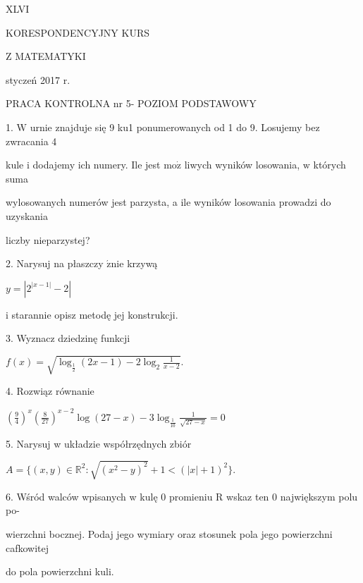\documentclass[a4paper,12pt]{article}
\begin{document}
XLVI

KORESPONDENCYJNY KURS

Z MATEMATYKI

styczeń 2017 r.

PRACA KONTROLNA nr 5- POZIOM PODSTAWOWY

1. $\mathrm{W}$ urnie znajduje się 9 ku1 ponumerowanych od 1 do 9. Losujemy bez zwracania 4

kule $\mathrm{i}$ dodajemy ich numery. Ile jest $\mathrm{m}\mathrm{o}\dot{\mathrm{z}}$ liwych wyników losowania, $\mathrm{w}$ których suma

wylosowanych numerów jest parzysta, a ile wyników losowania prowadzi do uzyskania

liczby nieparzystej?

2. Narysuj na płaszczy $\acute{\mathrm{z}}\mathrm{n}\mathrm{i}\mathrm{e}$ krzywą

$y=|2^{|x-1|}-2|$

i starannie opisz metodę jej konstrukcji.

3. Wyznacz dziedzinę funkcji

$f(x)=\sqrt{\log_{\frac{1}{2}}(2x-1)-2\log_{2}\frac{1}{x-2}}.$

4. Rozwiąz równanie

$(\displaystyle \frac{9}{4})^{x}(\frac{8}{27})^{x-2}\log(27-x)-3\log_{\frac{1}{10}}\frac{1}{\sqrt{27-x}}=0$

5. Narysuj w układzie współrzędnych zbiór

$A=\{(x,y)\in \mathbb{R}^{2}:\sqrt{(x^{2}-y)^{2}}+1<(|x|+1)^{2}\}.$

6. Wśród walców wpisanych w kulę 0 promieniu R wskaz ten 0 największym polu po-

wierzchni bocznej. Podaj jego wymiary oraz stosunek pola jego powierzchni cafkowitej

do pola powierzchni kuli.
\end{document}
